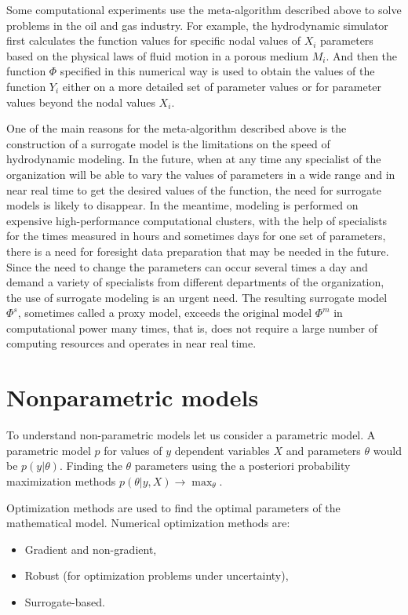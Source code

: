 \documentclass[12pt]{report}
\theoremstyle{definition}
\providecommand{\tightlist}{%
	\setlength{\itemsep}{0pt}\setlength{\parskip}{0pt}}
\begin{document}
Some computational experiments use the meta-algorithm described above to solve problems in the oil and gas industry. 
For example, the hydrodynamic simulator first calculates the function values for specific nodal values of $X_i$ parameters based on the physical laws of fluid motion in a porous medium $M_i$. 
And then the function $\Phi$ specified in this numerical way is used to obtain the values of the function $Y_i$ either on a more detailed set of parameter values or for parameter values beyond the nodal values $X_i$.

One of the main reasons for the meta-algorithm described above is the construction of a surrogate model is the limitations on the speed of hydrodynamic modeling. 
In the future, when at any time any specialist of the organization will be able to vary the values of parameters in a wide range and in near real time to get the desired values of the function, the need for surrogate models is likely to disappear.
In the meantime, modeling is performed on expensive high-performance computational clusters, with the help of specialists for the times measured in hours and sometimes days for one set of parameters, there is a need for foresight data preparation that may be needed in the future.
Since the need to change the parameters can occur several times a day and demand a variety of specialists from different departments of the organization, the use of surrogate modeling is an urgent need.
The resulting surrogate model $\Phi^s$, sometimes called a proxy model, exceeds the original model $\Phi^m$ in computational power many times, that is, does not require a large number of computing resources and operates in near real time.

\section{Nonparametric models}

To understand non-parametric models let us consider a parametric model. 
A parametric model $p$ for values of $y$ dependent variables $X$ and parameters $\theta$ would be $p\left( y\vert\theta \right)$.
Finding the $\theta$ parameters using the a posteriori probability maximization methods $p \left( \theta \vert y,X \right) \longrightarrow \max_\theta $.

Optimization methods are used to find the optimal parameters of the mathematical model.
Numerical optimization methods are:

\begin{itemize}
	\tightlist
	\item Gradient and non-gradient,
	\item Robust (for optimization problems under uncertainty), 
	\item Surrogate-based.
\end{itemize}
\end{document}
